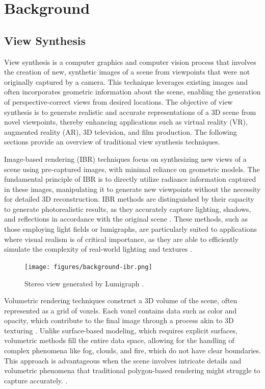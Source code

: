%
\chapter{Background}
\label{sec:background}

\section{View Synthesis}

View synthesis is a computer graphics and computer vision process that involves the creation of new, synthetic images of a scene from viewpoints that were not originally captured by a camera. This technique leverages existing images and often incorporates geometric information about the scene, enabling the generation of perspective-correct views from desired locations.
The objective of view synthesis is to generate realistic and accurate representations of a 3D scene from novel viewpoints, thereby enhancing applications such as virtual reality (VR), augmented reality (AR), 3D television, and film production. The following sections provide an overview of traditional view synthesis techniques.

Image-based rendering (IBR) techniques focus on synthesizing new views of a scene using pre-captured images, with minimal reliance on geometric models.
The fundamental principle of IBR is to directly utilize radiance information captured in these images, manipulating it to generate new viewpoints without the necessity for detailed 3D reconstruction.
IBR methods are distinguished by their capacity to generate photorealistic results, as they accurately capture lighting, shadows, and reflections in accordance with the original scene .
These methods, such as those employing light fields or lumigraphs, are particularly suited to applications where visual realism is of critical importance, as they are able to efficiently simulate the complexity of real-world lighting and textures \cite{buehler_unstructured_2001,chen_view_1993,debevec_modeling_1996,gortler_lumigraph_1996,levoy_light_1996}.

\begin{figure}[h!]
  \centering
	\texttt{[image: figures/background-ibr.png]}
	\caption{Stereo view generated by Lumigraph \cite{gortler_lumigraph_1996}.}
  \label{fig:background-ibr}
\end{figure}


Volumetric rendering techniques construct a 3D volume of the scene, often represented as a grid of voxels.
Each voxel contains data such as color and opacity, which contribute to the final image through a process akin to 3D texturing .
Unlike surface-based modeling, which requires explicit surfaces, volumetric methods fill the entire data space, allowing for the handling of complex phenomena like fog, clouds, and fire, which do not have clear boundaries.
This approach is advantageous when the scene involves intricate details and volumetric phenomena that traditional polygon-based rendering might struggle to capture accurately. \cite{curless_volumetric_1996,seitz_photorealistic_1999}.

